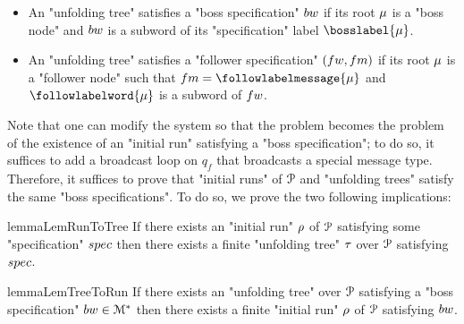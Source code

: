 \begin{itemize}
	\item An "unfolding tree" satisfies a "boss specification" $\bossspec$ if its root $\mu$ is a "boss node" and $\bossspec$ is a subword of its "specification" label $\bosslabel{\node}$.
	
	\item An "unfolding tree" satisfies a "follower specification" $(\followwordspec, \followmessagespec)$ if its root $\mu$ is a "follower node" such that $\followmessagespec=\followlabelmessage{\node}$ and  $\followlabelword{\node}$ is a subword of $\followwordspec$.
\end{itemize}

Note that one can modify the system so that the \COVER problem becomes the problem of the existence of an "initial run" satisfying a "boss specification"; to do so, it suffices to add a broadcast loop on $q_f$ that broadcasts a special message type. Therefore, it suffices to prove that "initial runs" of $\mathcal{P}$ and "unfolding trees" satisfy the same "boss specifications". To do so, we prove the two following implications:

\begin{restatable}{lemma}{LemRunToTree}
	\label{lem:run-to-tree}
	If there exists an "initial run" $\rho$ of $\mathcal{P}$ satisfying some "specification" $\spec$ then there exists a finite "unfolding tree" $\tau$ over $\mathcal{P}$ satisfying $\spec$.
\end{restatable}

\begin{restatable}{lemma}{LemTreeToRun}
	\label{lem:tree-to-run}
	If there exists an "unfolding tree" over $\mathcal{P}$ satisfying a "boss specification" $\bossspec \in \messages^*$ then there exists a finite "initial run" $\rho$ of $\mathcal{P}$ satisfying $\bossspec$.
\end{restatable}


	

